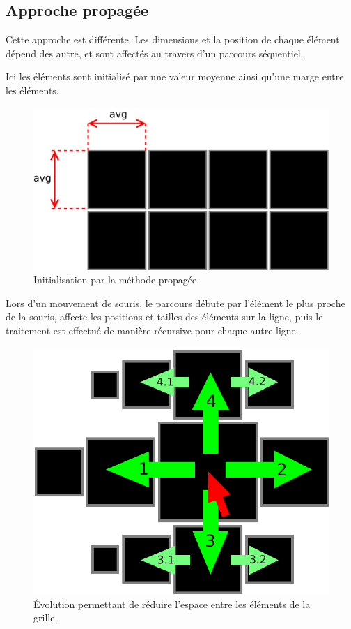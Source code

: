 \subsection{Approche propagée}
\label{subsec:propage}

Cette approche est différente. Les dimensions et la position de chaque élément dépend des autre, et sont affectés au travers d'un parcours séquentiel.

Ici les éléments sont initialisé par une valeur moyenne ainsi qu'une marge entre les éléments.

\begin{figure}[H]
  \centering
  \includegraphics[width=.7\textwidth]{../resources/illustrations/seq_app_init}
  \caption{Initialisation par la méthode propagée.}
\end{figure}

Lors d'un mouvement de souris, le parcours débute par l'élément le plus proche de la souris, affecte les positions et tailles des éléments sur la ligne, puis le traitement est effectué de manière récursive pour chaque autre ligne.

\begin{figure}[H]
  \centering
  \includegraphics[width=.7\textwidth]{../resources/illustrations/seq_app_mouse}
  \caption{Évolution permettant de réduire l'espace entre les éléments de la grille.}
\end{figure}

